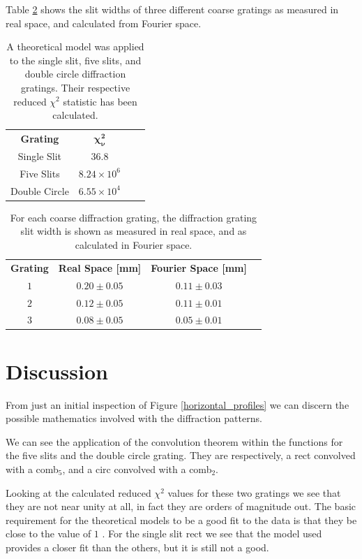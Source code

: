 \documentclass[twocolumn]{revtex4}
\begin{document}
Table \ref{realtofourier} shows the slit widths of three different coarse gratings as measured in real space, and calculated from Fourier space.
\begin{table}[h!]
\centering
\begin{tabular}{c@{\hskip 20pt}c@{\hskip 20pt}c@{\hskip 20pt}c} 
 \hline
 \textbf{Grating} & $\boldsymbol{\chi_\nu^2}$ \\ [0.5ex] 
 Single Slit &$36.8$ \\ 
 Five Slits & $8.24\times10^{6}$ \\
 Double Circle & $6.55\times10^{4}$ \\
 \hline
\end{tabular}
\caption{A theoretical model was applied to the single slit, five slits, and double circle diffraction gratings. Their respective reduced $\chi^2$ statistic has been calculated.}
\label{theoretical_model_applying}
\end{table}
\begin{table}[h!]
\centering
\begin{tabular}{c@{\hskip 15pt}c@{\hskip 15pt}c@{\hskip 10pt}c} 
 \hline
 \textbf{Grating} & \textbf{Real Space [mm]} & \textbf{Fourier Space [mm]} \\ [0.5ex] 
 $1$ &$0.20\pm0.05$ & $0.11\pm0.03$ \\ 
 $2$ & $0.12\pm0.05$ & $0.11\pm0.01$ \\
 $3$ & $0.08\pm0.05$ & $0.05\pm0.01$ \\
 \hline
\end{tabular}
\caption{For each coarse diffraction grating, the diffraction grating slit width is shown as measured in real space, and as calculated in Fourier space.}
\label{realtofourier}
\end{table}

\vspace{-3ex}
\section{Discussion}
\vspace{-2ex}
From just an initial inspection of Figure \ref{horizontal_profiles} we can discern the possible mathematics involved with the diffraction patterns.

We can see the application of the convolution theorem within the functions for the five slits and the double circle grating. They are respectively, a rect convolved with a comb$_5$, and a circ convolved with a comb$_2$. 

Looking at the calculated reduced $\chi^2$ values for these two gratings we see that they are not near unity at all, in fact they are orders of magnitude out. The basic requirement for the theoretical models to be a good fit to the data  is that they be close to the value of $1$ \cite{hughesandhayes}. For the single slit rect we see that the model used provides a closer fit than the others, but it is still not a good.
\end{document}
